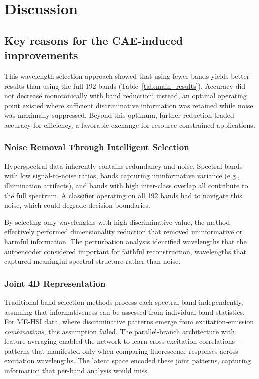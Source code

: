 \section{Discussion}
\label{sec:discussion}

\subsection{Key reasons for the CAE-induced improvements}
\label{sec:discussion_why}

This wavelength selection approach showed that using fewer bands yields better results than using the full 192 bands (Table~\ref{tab:main_results}). Accuracy did not decrease monotonically with band reduction; instead, an optimal operating point existed where sufficient discriminative information was retained while noise was maximally suppressed.
Beyond this optimum, further reduction traded accuracy for efficiency, a favorable exchange for resource-constrained applications.

\subsubsection{Noise Removal Through Intelligent Selection}
Hyperspectral data inherently contains redundancy and noise.
Spectral bands with low signal-to-noise ratios, bands capturing uninformative variance (e.g., illumination artifacts), and bands with high inter-class overlap all contribute to the full spectrum.
A classifier operating on all 192 bands had to navigate this noise, which could degrade decision boundaries.

By selecting only wavelengths with high discriminative value, the method effectively performed dimensionality reduction that removed uninformative or harmful information.
The perturbation analysis identified wavelengths that the autoencoder considered important for faithful reconstruction, wavelengths that captured meaningful spectral structure rather than noise.

\subsubsection{Joint 4D Representation}
Traditional band selection methods process each spectral band independently, assuming that informativeness can be assessed from individual band statistics.
For ME-HSI data, where discriminative patterns emerge from excitation-emission \emph{combinations}, this assumption failed.
The parallel-branch architecture with feature averaging enabled the network to learn cross-excitation correlations---patterns that manifested only when comparing fluorescence responses across excitation wavelengths.
The latent space encoded these joint patterns, capturing information that per-band analysis would miss.

